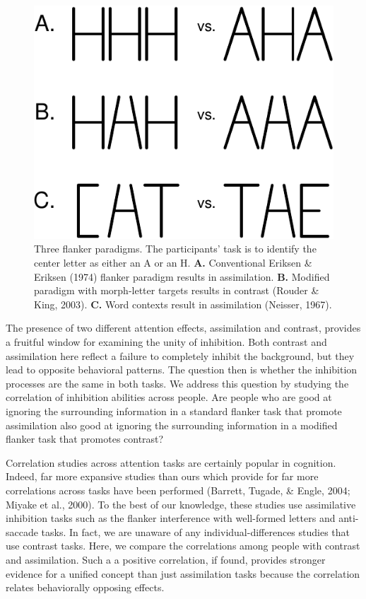 \documentclass[english,floatsintext,man]{apa6}
\theoremstyle{definition}
\theoremstyle{definition}
\theoremstyle{remark}
\begin{document}
\begin{figure}[htbp]
\centering
\includegraphics{paper_files/figure-latex/past-1.pdf}
\caption{\label{fig:past}Three flanker paradigms. The participants' task is
to identify the center letter as either an A or an H. \textbf{A.}
Conventional Eriksen \& Eriksen (1974) flanker paradigm results in
assimilation. \textbf{B.} Modified paradigm with morph-letter targets
results in contrast (Rouder \& King, 2003). \textbf{C.} Word contexts
result in assimilation (Neisser, 1967).}
\end{figure}

The presence of two different attention effects, assimilation and
contrast, provides a fruitful window for examining the unity of
inhibition. Both contrast and assimilation here reflect a failure to
completely inhibit the background, but they lead to opposite behavioral
patterns. The question then is whether the inhibition processes are the
same in both tasks. We address this question by studying the correlation
of inhibition abilities across people. Are people who are good at
ignoring the surrounding information in a standard flanker task that
promote assimilation also good at ignoring the surrounding information
in a modified flanker task that promotes contrast?

Correlation studies across attention tasks are certainly popular in
cognition. Indeed, far more expansive studies than ours which provide
for far more correlations across tasks have been performed (Barrett,
Tugade, \& Engle, 2004; Miyake et al., 2000). To the best of our
knowledge, these studies use assimilative inhibition tasks such as the
flanker interference with well-formed letters and anti-saccade tasks. In
fact, we are unaware of any individual-differences studies that use
contrast tasks. Here, we compare the correlations among people with
contrast and assimilation. Such a a positive correlation, if found,
provides stronger evidence for a unified concept than just assimilation
tasks because the correlation relates behaviorally opposing effects.
\end{document}
